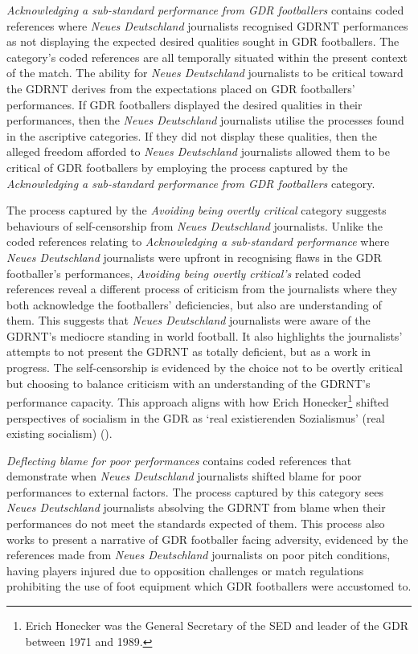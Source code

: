\textit{Acknowledging a sub-standard performance from GDR footballers} contains coded references where \textit{Neues Deutschland} journalists recognised GDRNT performances as not displaying the expected desired qualities sought in GDR footballers. The category’s coded references are all temporally situated within the present context of the match. The ability for \textit{Neues Deutschland} journalists to be critical toward the GDRNT derives from the expectations placed on GDR footballers’ performances. If GDR footballers displayed the desired qualities in their performances, then the \textit{Neues Deutschland} journalists utilise the processes found in the ascriptive categories. If they did not display these qualities, then the alleged freedom afforded to \textit{Neues Deutschland} journalists allowed them to be critical of GDR footballers by employing the process captured by the \textit{Acknowledging a sub-standard performance from GDR footballers} category.

The process captured by the \textit{Avoiding being overtly critical} category suggests behaviours of self-censorship from \textit{Neues Deutschland} journalists. Unlike the coded references relating to \textit{Acknowledging a sub-standard performance} where \textit{Neues Deutschland} journalists were upfront in recognising flaws in the GDR footballer’s performances, \textit{Avoiding being overtly critical’s} related coded references reveal a different process of criticism from the journalists where they both acknowledge the footballers’ deficiencies, but also are understanding of them. This suggests that \textit{Neues Deutschland} journalists were aware of the GDRNT’s mediocre standing in world football. It also highlights the journalists’ attempts to not present the GDRNT as totally deficient, but as a work in progress. The self-censorship is evidenced by the choice not to be overtly critical but choosing to balance criticism with an understanding of the GDRNT’s performance capacity. This approach aligns with how Erich Honecker\footnote{Erich Honecker was the General Secretary of the SED and leader of the GDR between 1971 and 1989.} shifted perspectives of socialism in the GDR as ‘real existierenden Sozialismus’ (real existing socialism) (\cite{borowsky2002}).

\textit{Deflecting blame for poor performances} contains coded references that demonstrate when \textit{Neues Deutschland} journalists shifted blame for poor performances to external factors. The process captured by this category sees \textit{Neues Deutschland} journalists absolving the GDRNT from blame when their performances do not meet the standards expected of them. This process also works to present a narrative of GDR footballer facing adversity, evidenced by the references made from \textit{Neues Deutschland} journalists on poor pitch conditions, having players injured due to opposition challenges or match regulations prohibiting the use of foot equipment which GDR footballers were accustomed to.

